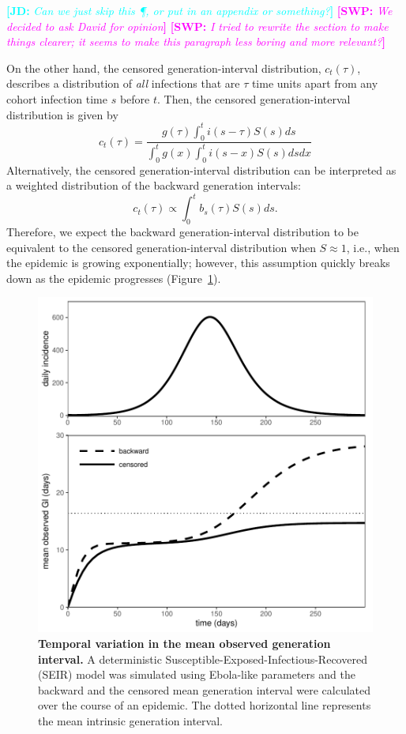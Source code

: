 \documentclass[12pt]{article}
\newcommand{\comment}[3]{\textcolor{#1}{\textbf{[#2: }\textsl{#3}\textbf{]}}}
\newcommand{\jd}[1]{\comment{cyan}{JD}{#1}}
\newcommand{\swp}[1]{\comment{magenta}{SWP}{#1}}
\begin{document}
\jd{Can we just skip this \P, or put in an appendix or something?}
\swp{We decided to ask David for opinion}
\swp{I tried to rewrite the section to make things clearer; it seems to make this paragraph less boring and more relevant?}

On the other hand, the censored generation-interval distribution, $c_t(\tau)$, describes a distribution of \emph{all} infections that are $\tau$ time units apart from any cohort infection time $s$ before $t$.
Then, the censored generation-interval distribution is given by
\begin{equation}\label{eq:obsg}
c_t(\tau) = \frac{g(\tau) \int_0^t i(s-\tau) S(s) ds}{\int_0^t g(x) \int_0^t i(s-x) S(s) ds dx}
\end{equation}
Alternatively, the censored generation-interval distribution can be interpreted as a weighted distribution of the backward generation intervals:
\begin{equation}
c_t(\tau) \propto \int_0^t b_s(\tau) S(s) ds.
\end{equation}
Therefore, we expect the backward generation-interval distribution to be equivalent to the censored generation-interval distribution when $S \approx 1$, i.e., when the epidemic is growing exponentially;
however, this assumption quickly breaks down as the epidemic progresses (Figure~\ref{fig:censor}).

\begin{figure}[!ht]
\includegraphics[width=\textwidth]{../fig/temporal_effect.pdf}
\caption{\textbf{Temporal variation in the mean observed generation interval.}
A deterministic Susceptible-Exposed-Infectious-Recovered (SEIR) model was simulated using Ebola-like parameters and the backward and the censored mean generation interval were calculated over the course of an epidemic.
The dotted horizontal line represents the mean intrinsic generation interval.
}
\label{fig:censor}
\end{figure}
\end{document}
